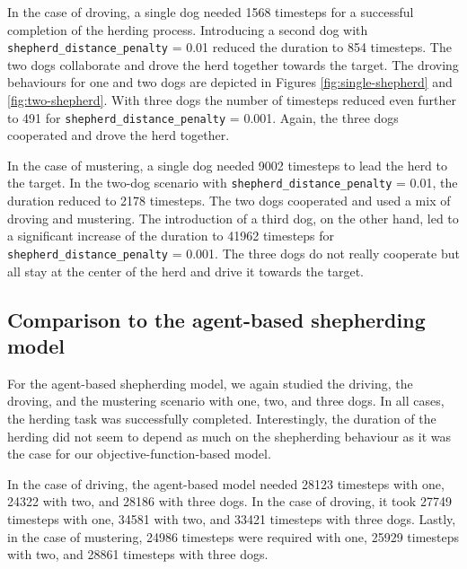 In the case of droving, a single dog needed 1568 timesteps for a successful completion of the herding process. Introducing a second dog with \texttt{shepherd\_distance\_penalty} = 0.01 reduced the duration to 854 timesteps. The two dogs collaborate and drove the herd together towards the target. The droving behaviours for one and two dogs are depicted in Figures \ref{fig:single-shepherd}  and \ref{fig:two-shepherd}. With three dogs the number of timesteps reduced even further to 491 for \texttt{shepherd\_distance\_penalty} = 0.001. Again, the three dogs cooperated and drove the herd together.

In the case of mustering, a single dog needed 9002 timesteps to lead the herd to the target. In the two-dog scenario with  \texttt{shepherd\_distance\_penalty} = 0.01, the duration reduced to 2178 timesteps. The two dogs cooperated and used a mix of droving and mustering. The introduction of a third dog, on the other hand, led to a significant increase of the duration to 41962 timesteps for \texttt{shepherd\_distance\_penalty} = 0.001. The three dogs do not really cooperate but all stay at the center of the herd and drive it towards the target.

\subsection{Comparison to the agent-based shepherding model}

For the agent-based shepherding model, we again studied the driving, the droving, and the mustering scenario with one, two, and three dogs. In all cases, the herding task was successfully completed. Interestingly, the duration of the herding did not seem to depend as much on the shepherding behaviour as it was the case for our objective-function-based model.

In the case of driving, the agent-based model needed 28123 timesteps with one, 24322 with two, and 28186 with three dogs. In the case of droving, it took 27749 timesteps with one, 34581 with two, and 33421 timesteps with three dogs. Lastly, in the case of mustering, 24986 timesteps were required with one, 25929 timesteps with two, and 28861 timesteps with three dogs.